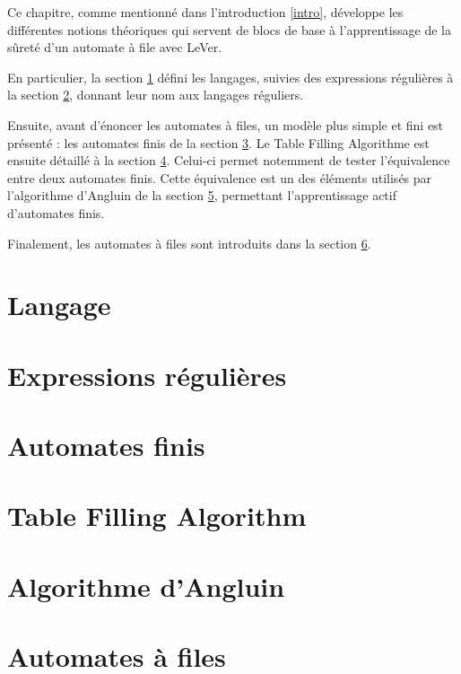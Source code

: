 Ce chapitre, comme mentionné dans l'introduction \ref{intro}, développe les différentes notions théoriques qui servent de blocs de base à l'apprentissage de la sûreté d'un automate à file avec LeVer.

En particulier, la section \ref{lang} défini les langages, suivies des expressions régulières à la section \ref{regex}, donnant leur nom aux langages réguliers.

Ensuite, avant d'énoncer les automates à files, un modèle plus simple et fini est présenté : les automates finis de la section \ref{adf}. Le Table Filling Algorithme est ensuite détaillé à la section \ref{tfa}. Celui-ci permet notemment de tester l'équivalence entre deux automates finis. Cette équivalence est un des éléments utilisés par l'algorithme d'Angluin de la section \ref{angluin}, permettant l'apprentissage actif d'automates finis.

Finalement, les automates à files sont introduits dans la section \ref{fifo}.

\section{Langage}\label{lang}
\section{Expressions régulières}\label{regex}
\section{Automates finis}\label{adf}
\section{Table Filling Algorithm}\label{tfa}
\section{Algorithme d'Angluin}\label{angluin}
\section{Automates à files}\label{fifo}
